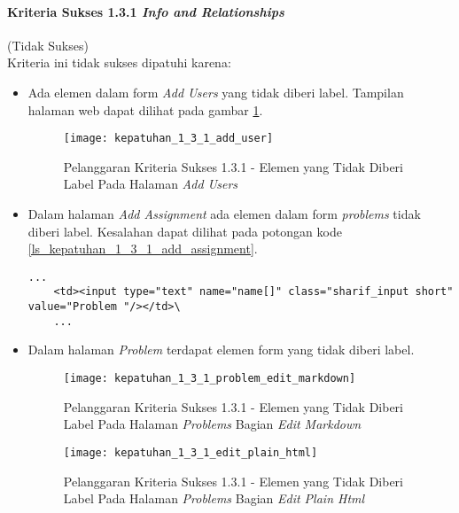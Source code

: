 \paragraph{Kriteria Sukses 1.3.1 \textit{Info and Relationships}}
\label{subsubsec:kepatuhan_kriteria_1.3.1}
(Tidak Sukses) \\

Kriteria ini tidak sukses dipatuhi karena:
\begin{itemize}
	\item Ada elemen dalam form \textit{Add Users} yang tidak diberi label. Tampilan halaman web dapat dilihat pada gambar \ref{fig:kepatuhan_1_3_1_add_user}.
	\begin{figure}[H]
		\centering  
		\texttt{[image: kepatuhan\_1\_3\_1\_add\_user]}  
		\caption[Pelanggaran Kriteria Sukses 1.3.1 - Elemen yang Tidak Diberi Label Pada Halaman \textit{Add Users}]{Pelanggaran Kriteria Sukses 1.3.1 - Elemen yang Tidak Diberi Label Pada Halaman \textit{Add Users}} 
		\label{fig:kepatuhan_1_3_1_add_user} 
	\end{figure}
	\item Dalam halaman \textit{Add Assignment} ada elemen dalam form \textit{problems} tidak diberi label. Kesalahan dapat dilihat pada potongan kode \ref{ls_kepatuhan_1_3_1_add_assignment}.
	\begin{lstlisting}[basicstyle=\ttfamily, frame=single,
	columns=fullflexible, keepspaces=true, breaklines=true, label=ls_kepatuhan_1_3_1_add_assignment, caption=Pelanggaran Kriteria Sukses 1.3.1 - Elemen Dalam Form yang Tidak Diberi Label]
	...
	<td><input type="text" name="name[]" class="sharif_input short" value="Problem "/></td>\
	...
	\end{lstlisting}
	
	\item Dalam halaman \textit{Problem} terdapat elemen form yang tidak diberi label.
	\begin{figure}[H]
		\centering  
		\texttt{[image: kepatuhan\_1\_3\_1\_problem\_edit\_markdown]}  
		\caption[Pelanggaran Kriteria Sukses 1.3.1 - Elemen yang Tidak Diberi Label Pada Halaman \textit{Problems} Bagian \textit{Edit Markdown}]{Pelanggaran Kriteria Sukses 1.3.1 - Elemen yang Tidak Diberi Label Pada Halaman \textit{Problems} Bagian \textit{Edit Markdown}} 
		\label{fig:kepatuhan_1_3_1_problem_edit_markdown} 
	\end{figure}
	\begin{figure}[H]
		\centering  
		\texttt{[image: kepatuhan\_1\_3\_1\_edit\_plain\_html]}  
		\caption[Pelanggaran Kriteria Sukses 1.3.1 - Elemen yang Tidak Diberi Label Pada Halaman \textit{Problems} Bagian \textit{Edit Plain Html}]{Pelanggaran Kriteria Sukses 1.3.1 - Elemen yang Tidak Diberi Label Pada Halaman \textit{Problems} Bagian \textit{Edit Plain Html}} 
		\label{fig:kepatuhan_1_3_1_plain_html} 
	\end{figure}
\end{itemize}

